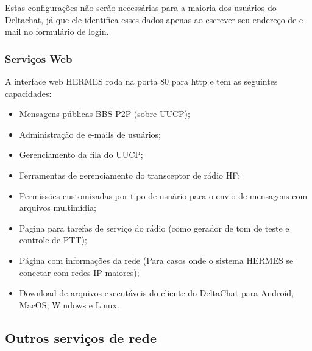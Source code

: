 \documentclass[11pt,a4paper]{article}
\begin{document}
Estas configurações não serão necessárias para a maioria dos usuários do Deltachat, já que ele identifica esses dados apenas ao escrever seu endereço de e-mail no formulário de login.


\subsubsection{Serviços Web}
\label{apx_net_web}

A interface web HERMES roda na porta 80 para http e tem as seguintes capacidades:
\begin{itemize}
    \item Mensagens públicas BBS P2P (sobre UUCP);

    \item Administração de e-mails de usuários;
    \item Gerenciamento da fila do UUCP;
    \item Ferramentas de gerenciamento do transceptor de rádio HF;
    \item Permissões customizadas por tipo de usuário para o envio de mensagens com arquivos multimídia;
    \item Pagina para tarefas de serviço do rádio (como gerador de tom de teste e controle de PTT);
    \item Página com informações da rede (Para casos onde o sistema HERMES se conectar com redes IP maiores);
    \item Download de arquivos executáveis do cliente do DeltaChat para Android, MacOS, Windows e Linux.
\end{itemize}

\subsection{Outros serviços de rede }
\label{apx_other_net}
\end{document}
